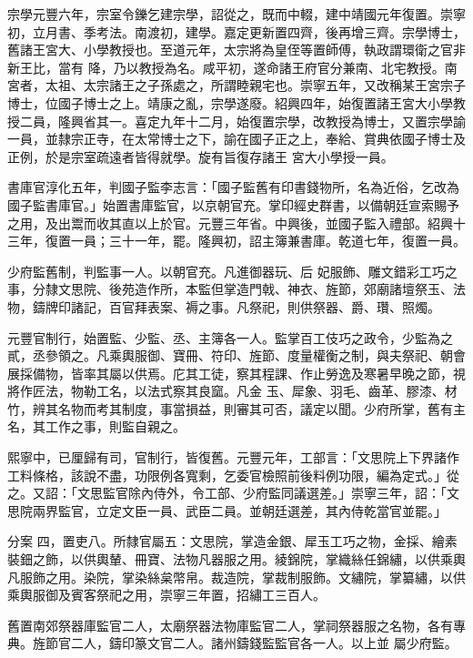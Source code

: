 \begin{pinyinscope}
 宗學元豐六年，宗室令鑠乞建宗學，詔從之，既而中輟，建中靖國元年復置。崇寧初，立月書、季考法。南渡初，建學。嘉定更新置四齊，後再增三齊。宗學博士，舊諸王宮大、小學教授也。至道元年，太宗將為皇侄等置師傅，執政謂環衛之官非新王比，當有
 降，乃以教授為名。咸平初，遂命諸王府官分兼南、北宅教授。南宮者，太祖、太宗諸王之子孫處之，所謂睦親宅也。崇寧五年，又改稱某王宮宗子博士，位國子博士之上。靖康之亂，宗學遂廢。紹興四年，始復置諸王宮大小學教授二員，隆興省其一。喜定九年十二月，始復置宗學，改教授為博士，又置宗學諭一員，並隸宗正寺，在太常博士之下，諭在國子正之上，奉給、賞典依國子博士及正例，於是宗室疏遠者皆得就學。旋有旨復存諸王
 宮大小學授一員。



 書庫官淳化五年，判國子監李志言：「國子監舊有印書錢物所，名為近俗，乞改為國子監書庫官。」始置書庫監官，以京朝官充。掌印經史群書，以備朝廷宣索賜予之用，及出鬻而收其直以上於官。元豐三年省。中興後，並國子監入禮部。紹興十三年，復置一員；三十一年，罷。隆興初，詔主簿兼書庫。乾道七年，復置一員。



 少府監舊制，判監事一人。以朝官充。凡進御器玩、后
 妃服飾、雕文錯彩工巧之事，分隸文思院、後苑造作所，本監但掌造門戟、神衣、旌節，郊廟諸壇祭玉、法物，鑄牌印諸記，百官拜表案、褥之事。凡祭祀，則供祭器、爵、瓚、照燭。



 元豐官制行，始置監、少監、丞、主簿各一人。監掌百工伎巧之政令，少監為之貳，丞參領之。凡乘輿服御、寶冊、符印、旌節、度量權衡之制，與夫祭祀、朝會展採備物，皆率其屬以供焉。庀其工徒，察其程課、作止勞逸及寒暑早晚之節，視將作匠法，物勒工名，以法式察其良窳。凡金
 玉、犀象、羽毛、齒革、膠漆、材竹，辨其名物而考其制度，事當損益，則審其可否，議定以聞。少府所掌，舊有主名，其工作之事，則監自親之。



 熙寧中，已厘歸有司，官制行，皆復舊。元豐元年，工部言：「文思院上下界諸作工料條格，該說不盡，功限例各寬剩，乞委官檢照前後料例功限，編為定式。」從之。又詔：「文思監官除內侍外，令工部、少府監同議選差。」崇寧三年，詔：「文思院兩界監官，立定文臣一員、武臣二員。並朝廷選差，其內侍乾當官並罷。」



 分案
 四，置吏八。所隸官屬五：文思院，掌造金銀、犀玉工巧之物，金採、繪素裝鈿之飾，以供輿輦、冊寶、法物凡器服之用。綾錦院，掌織絲任錦繡，以供乘輿凡服飾之用。染院，掌染絲枲幣帛。裁造院，掌裁制服飾。文繡院，掌纂繡，以供乘輿服御及賓客祭祀之用，崇寧三年置，招繡工三百人。



 舊置南郊祭器庫監官二人，太廟祭器法物庫監官二人，掌祠祭器服之名物，各有專典。旌節官二人，鑄印篆文官二人。諸州鑄錢監監官各一人。以上並
 屬少府監。




\end{pinyinscope}
